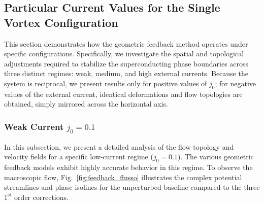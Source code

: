 \documentclass[english,binding=0.6cm,noexaminfo]{sapthesis}
\begin{document}
\subsection{Particular Current Values for the Single Vortex Configuration}
\label{sec:particularconfig}
This section demonstrates how the geometric feedback method operates under specific configurations. Specifically, we investigate the spatial and topological adjustments required to stabilize the superconducting phase boundaries across three distinct regimes: weak, medium, and high external currents. Because the system is reciprocal, we present results only for positive values of $j_0$; for negative values of the external current, identical deformations and flow topologies are obtained, simply mirrored across the horizontal axis.

\subsubsection{Weak Current $j_0=0.1$}
In this subsection, we present a detailed analysis of the flow topology and velocity fields for a specific low-current regime ($j_0=0.1$). The various geometric feedback models exhibit highly accurate behavior in this regime. To observe the macroscopic flow, Fig.~\ref{fig:feedback_flusso} illustrates the complex potential streamlines and phase isolines for the unperturbed baseline compared to the three $1^{\text{st}}$ order corrections.
\end{document}
